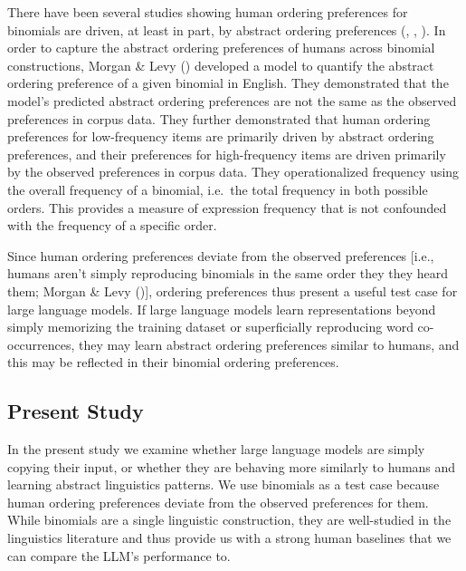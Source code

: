 \documentclass[
  12pt,
  letterpaper,
]{scrreprt}
\begin{document}
There have been several studies showing human ordering preferences for
binomials are driven, at least in part, by abstract ordering preferences
(,
,
). In order to capture the abstract
ordering preferences of humans across binomial constructions, Morgan \&
Levy () developed
a model to quantify the abstract ordering preference of a given binomial
in English. They demonstrated that the model's predicted abstract
ordering preferences are not the same as the observed preferences in
corpus data. They further demonstrated that human ordering preferences
for low-frequency items are primarily driven by abstract ordering
preferences, and their preferences for high-frequency items are driven
primarily by the observed preferences in corpus data. They
operationalized frequency using the overall frequency of a binomial,
i.e.~the total frequency in both possible orders. This provides a
measure of expression frequency that is not confounded with the
frequency of a specific order.

Since human ordering preferences deviate from the observed preferences
{[}i.e., humans aren't simply reproducing binomials in the same order
they they heard them; Morgan \& Levy
(){]}, ordering preferences thus present
a useful test case for large language models. If large language models
learn representations beyond simply memorizing the training dataset or
superficially reproducing word co-occurrences, they may learn abstract
ordering preferences similar to humans, and this may be reflected in
their binomial ordering preferences.

\subsection{Present Study}\label{present-study-1}

In the present study we examine whether large language models are simply
copying their input, or whether they are behaving more similarly to
humans and learning abstract linguistics patterns. We use binomials as a
test case because human ordering preferences deviate from the observed
preferences for them. While binomials are a single linguistic
construction, they are well-studied in the linguistics literature and
thus provide us with a strong human baselines that we can compare the
LLM's performance to.
\end{document}
